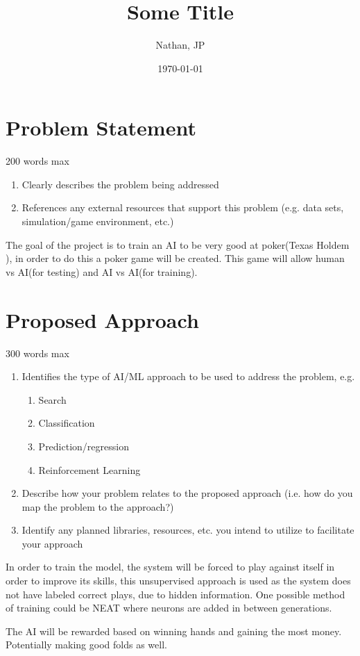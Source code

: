 \documentclass[11pt]{article}
\title{Some Title}
\author{Nathan, JP}
\date{\today}
\begin{document}
\maketitle
\section{Problem Statement}
200 words max
\begin{enumerate}
\item Clearly describes the problem being addressed
\item References any external resources that support this problem (e.g. data sets, simulation/game environment,
  etc.)
\end{enumerate}

The goal of the project is to train an AI to be very good at poker(Texas Holdem \cite{TexasHoldEm}), in order to do this a poker
game will be created. This game will allow human vs AI(for testing) and AI vs AI(for training).

\section{Proposed Approach}
300 words max
\begin{enumerate}
\item Identifies the type of AI/ML approach to be used to address the problem, e.g.
  \begin{enumerate}
  \item Search
  \item Classification
  \item Prediction/regression
  \item Reinforcement Learning
  \end{enumerate}
\item Describe how your problem relates to the proposed approach (i.e. how do you map the problem to the
  approach?)
\item Identify any planned libraries, resources, etc. you intend to utilize to facilitate your approach
\end{enumerate}
In order to train the model, the system will be forced to play against itself in order to improve its skills,
this unsupervised approach is used as the system does not have labeled correct plays, due to hidden information.
One possible method of training could be NEAT\cite{NEAT} where neurons are added in between generations.

The AI will be rewarded based on winning hands and gaining the most money. Potentially making good folds as well.
\end{document}
